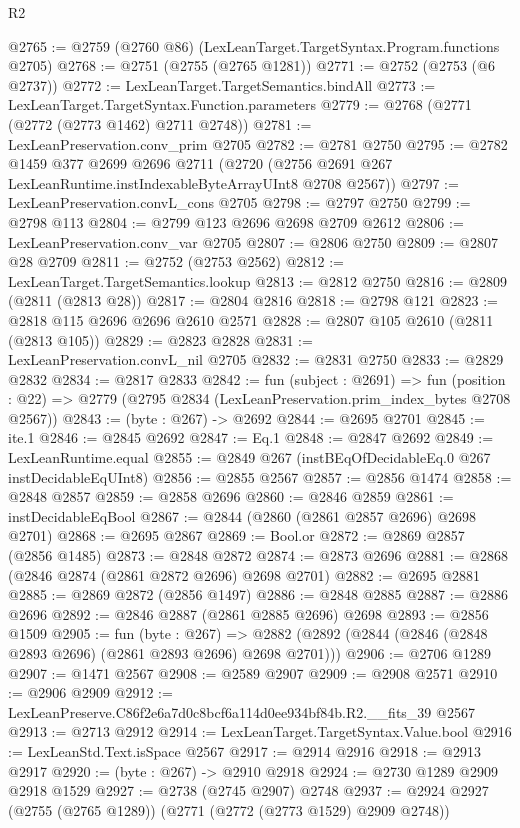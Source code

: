 \begin{lexlean}{R2}
\begin{coremodule}
@2765 := @2759 (@2760 @86) (LexLeanTarget.TargetSyntax.Program.functions @2705)
@2768 := @2751 (@2755 (@2765 @1281))
@2771 := @2752 (@2753 (@6 @2737))
@2772 := LexLeanTarget.TargetSemantics.bindAll
@2773 := LexLeanTarget.TargetSyntax.Function.parameters
@2779 := @2768 (@2771 (@2772 (@2773 @1462) @2711 @2748))
@2781 := LexLeanPreservation.conv_prim @2705
@2782 := @2781 @2750
@2795 := @2782
    @1459
    @377
    @2699
    @2696
    @2711
    (@2720 (@2756 @2691 @267 LexLeanRuntime.instIndexableByteArrayUInt8 @2708 @2567))
@2797 := LexLeanPreservation.convL_cons @2705
@2798 := @2797 @2750
@2799 := @2798 @113
@2804 := @2799 @123 @2696 @2698 @2709 @2612
@2806 := LexLeanPreservation.conv_var @2705
@2807 := @2806 @2750
@2809 := @2807 @28 @2709
@2811 := @2752 (@2753 @2562)
@2812 := LexLeanTarget.TargetSemantics.lookup
@2813 := @2812 @2750
@2816 := @2809 (@2811 (@2813 @28))
@2817 := @2804 @2816
@2818 := @2798 @121
@2823 := @2818 @115 @2696 @2696 @2610 @2571
@2828 := @2807 @105 @2610 (@2811 (@2813 @105))
@2829 := @2823 @2828
@2831 := LexLeanPreservation.convL_nil @2705
@2832 := @2831 @2750
@2833 := @2829 @2832
@2834 := @2817 @2833
@2842 := fun (subject : @2691) =>
  fun (position : @22) => @2779 (@2795 @2834 (LexLeanPreservation.prim_index_bytes @2708 @2567))
@2843 := (byte : @267) -> @2692
@2844 := @2695 @2701
@2845 := ite.{1}
@2846 := @2845 @2692
@2847 := Eq.{1}
@2848 := @2847 @2692
@2849 := LexLeanRuntime.equal
@2855 := @2849 @267 (instBEqOfDecidableEq.{0} @267 instDecidableEqUInt8)
@2856 := @2855 @2567
@2857 := @2856 @1474
@2858 := @2848 @2857
@2859 := @2858 @2696
@2860 := @2846 @2859
@2861 := instDecidableEqBool
@2867 := @2844 (@2860 (@2861 @2857 @2696) @2698 @2701)
@2868 := @2695 @2867
@2869 := Bool.or
@2872 := @2869 @2857 (@2856 @1485)
@2873 := @2848 @2872
@2874 := @2873 @2696
@2881 := @2868 (@2846 @2874 (@2861 @2872 @2696) @2698 @2701)
@2882 := @2695 @2881
@2885 := @2869 @2872 (@2856 @1497)
@2886 := @2848 @2885
@2887 := @2886 @2696
@2892 := @2846 @2887 (@2861 @2885 @2696) @2698
@2893 := @2856 @1509
@2905 := fun (byte : @267) =>
  @2882 (@2892 (@2844 (@2846 (@2848 @2893 @2696) (@2861 @2893 @2696) @2698 @2701)))
@2906 := @2706 @1289
@2907 := @1471 @2567
@2908 := @2589 @2907
@2909 := @2908 @2571
@2910 := @2906 @2909
@2912 := LexLeanPreserve.C86f2e6a7d0c8bcf6a114d0ee934bf84b.R2.__fits_39 @2567
@2913 := @2713 @2912
@2914 := LexLeanTarget.TargetSyntax.Value.bool
@2916 := LexLeanStd.Text.isSpace @2567
@2917 := @2914 @2916
@2918 := @2913 @2917
@2920 := (byte : @267) -> @2910 @2918
@2924 := @2730 @1289 @2909 @2918 @1529
@2927 := @2738 (@2745 @2907) @2748
@2937 := @2924 @2927 (@2755 (@2765 @1289)) (@2771 (@2772 (@2773 @1529) @2909 @2748))

\end{coremodule}
\end{lexlean}
